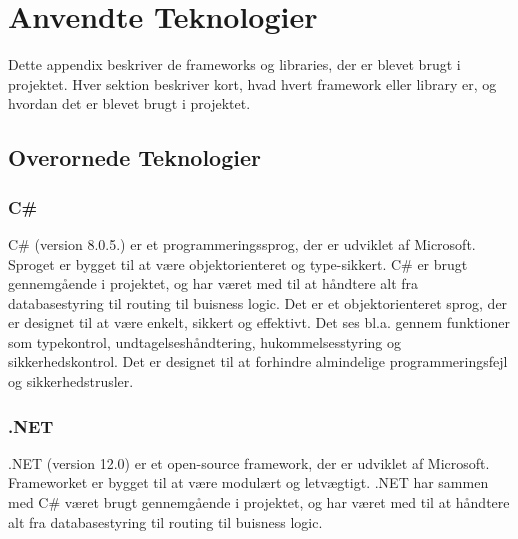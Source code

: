 \chapter{Anvendte Teknologier} 
\label{chapter:anvendte-teknologier}
Dette appendix beskriver de frameworks og libraries, der er blevet brugt i projektet. Hver sektion beskriver kort, hvad hvert framework eller library er, og hvordan det er blevet brugt i projektet.

\section{Overornede Teknologier}
\subsection{C\#}
C\# (version 8.0.5.) er et programmeringssprog, der er udviklet af Microsoft. Sproget er bygget til at være objektorienteret og type-sikkert. 
C\# er brugt gennemgående i projektet, og har været med til at håndtere alt fra databasestyring til routing til buisness logic.
Det er et objektorienteret sprog, der er designet til at være enkelt, sikkert og effektivt. Det ses bl.a. gennem funktioner som typekontrol, undtagelseshåndtering, hukommelsesstyring og sikkerhedskontrol. Det er designet til at forhindre almindelige programmeringsfejl og sikkerhedstrusler.

\subsection{.NET}
.NET (version 12.0) er et open-source framework, der er udviklet af Microsoft. Frameworket er bygget til at være modulært og letvægtigt.
.NET har sammen med C\# været brugt gennemgående i projektet, og har været med til at håndtere alt fra databasestyring til routing til buisness logic.

